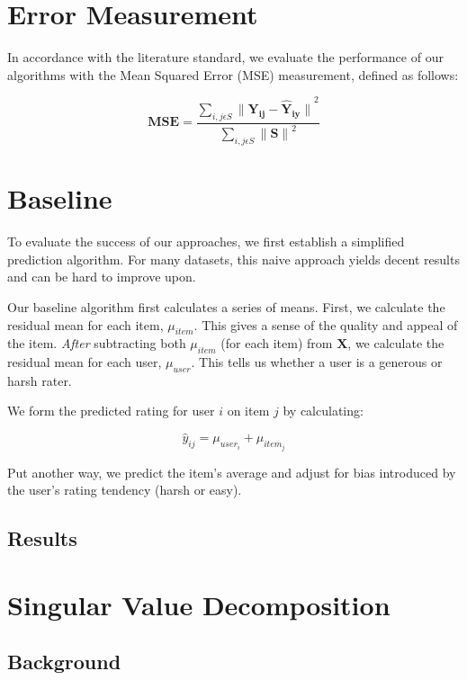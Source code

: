 \documentclass[12pt]{article}
\begin{document}
\section{Error Measurement}
In accordance with the literature standard, we evaluate the performance of our algorithms with the Mean Squared Error (MSE) measurement, defined as follows:

$$ \mathbf{MSE} = \frac{\sum\limits_{i,j \epsilon S} {\mathbf{\|Y_{ij} - \hat{Y}_{iy}\|}}^2}{\sum\limits_{i,j \epsilon S}{\mathbf{\|S\|}}^2} $$

\section{Baseline}
To evaluate the success of our approaches, we first establish a simplified prediction algorithm. For many datasets, this naive approach yields decent results and can be hard to improve upon.

Our baseline algorithm first calculates a series of means. First, we calculate the residual mean for each item, $\mu_{item}$. This gives a sense of the quality and appeal of the item. \textit{After} subtracting both $\mu_{item}$ (for each item) from $\mathbf{X}$, we calculate the residual mean for each user, $\mu_{user}$. This tells us whether a user is a generous or harsh rater.

We form the predicted rating for user $i$ on item $j$ by calculating:

$$\hat y_{ij} = \mu_{user_i} + \mu_{item_j}$$

Put another way, we predict the item's average and adjust for bias introduced by the user's rating tendency (harsh or easy).

\subsection{Results}

\section{Singular Value Decomposition}
\subsection{Background}
\end{document}
